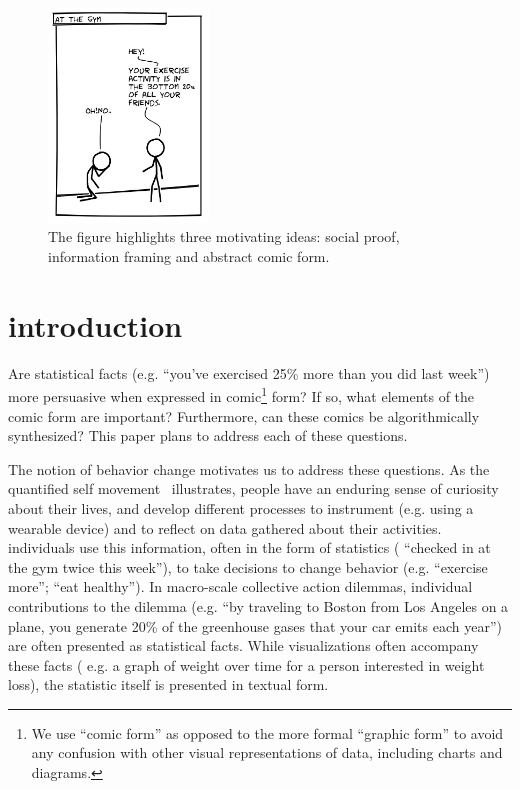 


\setlength\intextsep{0pt}
\begin{figure}
  \centering
    \includegraphics[width=0.38\textwidth]{figures/intro_new.png}
  \caption{The figure highlights three motivating ideas: social proof, information framing and abstract comic form.}
\end{figure}

\section{introduction}
\label{sec:introduction}
Are statistical facts (e.g. ``you've exercised 25\% more than you did last week'') more persuasive when expressed in comic\footnote{We use ``comic form'' as opposed to the more formal ``graphic form'' to avoid any confusion with other visual representations of data, including charts and diagrams.} form? If so, what elements of the comic form are important? Furthermore, can these comics be algorithmically synthesized? This paper plans to address each of these questions.

The notion of behavior change motivates us to address these questions. As the quantified self movement~\cite{Epstein2014,Choe2014} illustrates, people have an enduring sense of curiosity about their lives, and develop different processes to instrument (e.g. using a wearable device) and to reflect on data gathered about their activities. individuals use this information, often in the form of statistics ( ``checked in at the gym twice this week''), to take decisions to change behavior (e.g. ``exercise more''; ``eat healthy''). In macro-scale collective action dilemmas, individual contributions to the dilemma (e.g. ``by traveling to Boston from Los Angeles on a plane, you generate 20\% of the greenhouse gases that your car emits each year'') are often presented as statistical facts. While visualizations often accompany these facts ( e.g. a graph of weight over time for a person interested in weight loss), the statistic itself is presented in textual form.

